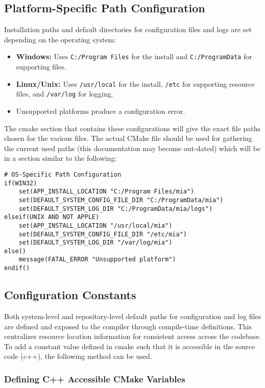 \subsection{Platform-Specific Path Configuration}

Installation paths and default directories for configuration files and logs are set depending on the operating system:
\begin{itemize}
	\item \textbf{Windows:} Uses \texttt{C:/Program Files} for the install and \texttt{C:/ProgramData} for supporting files.
	\item \textbf{Linux/Unix:} Uses \texttt{/usr/local} for the install, \texttt{/etc} for supporting resource files, and \texttt{/var/log} for logging.
	\item Unsupported platforms produce a configuration error.
\end{itemize}
The cmake section that contains these configurations will give the exact file paths chosen for the various files. The actual CMake file should be used for gathering the current used paths (this documentation may become out-dated) which will be in a section similar to the following:
\begin{lstlisting}[style=shellstyle]
# OS-Specific Path Configuration
if(WIN32)
    set(APP_INSTALL_LOCATION "C:/Program Files/mia")
    set(DEFAULT_SYSTEM_CONFIG_FILE_DIR "C:/ProgramData/mia")
    set(DEFAULT_SYSTEM_LOG_DIR "C:/ProgramData/mia/logs")
elseif(UNIX AND NOT APPLE)
    set(APP_INSTALL_LOCATION "/usr/local/mia")
    set(DEFAULT_SYSTEM_CONFIG_FILE_DIR "/etc/mia")
    set(DEFAULT_SYSTEM_LOG_DIR "/var/log/mia")
else()
    message(FATAL_ERROR "Unsupported platform")
endif()
\end{lstlisting}

\subsection{Configuration Constants}

Both system-level and repository-level default paths for configuration and log files are defined and exposed to the compiler through compile-time definitions. This centralizes resource location information for consistent access across the codebase. To add a constant value defined in cmake such that it is accessible in the source code (c++), the following method can be used.

\subsubsection{Defining C++ Accessible CMake Variables}
\label{sec:CMake-setup-cpp}

